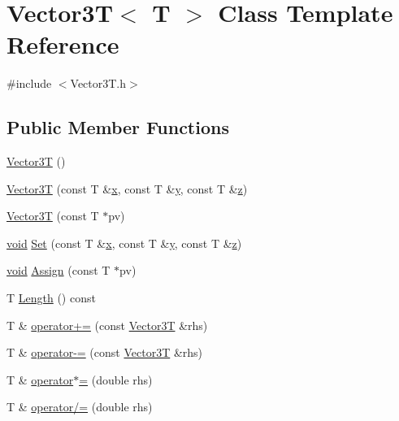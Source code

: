 \hypertarget{class_vector3_t}{\section{Vector3\+T$<$ T $>$ Class Template Reference}
\label{class_vector3_t}
}


{\ttfamily \#include $<$Vector3\+T.\+h$>$}

\subsection*{Public Member Functions}
\begin{DoxyCompactItemize}
\item 
\hyperlink{class_vector3_t_abab8ea3d1ea94c18782f5154469023b0}{Vector3\+T} ()
\item 
\hyperlink{class_vector3_t_a0ab19f96d1244ee04eac4d9e8eea0447}{Vector3\+T} (const T \&\hyperlink{glext_8h_ad77deca22f617d3f0e0eb786445689fc}{x}, const T \&\hyperlink{glext_8h_a9298c7ad619074f5285b32c6b72bfdea}{y}, const T \&\hyperlink{glext_8h_a1483160fae141afea848a5393c286b2b}{z})
\item 
\hyperlink{class_vector3_t_a85ec9693b025744519289511f00aea2e}{Vector3\+T} (const T $\ast$pv)
\item 
\hyperlink{wglext_8h_a9e6b7f1933461ef318bb000d6bd13b83}{void} \hyperlink{class_vector3_t_a4302d8d261afb559e29342f6ade7e2a0}{Set} (const T \&\hyperlink{glext_8h_ad77deca22f617d3f0e0eb786445689fc}{x}, const T \&\hyperlink{glext_8h_a9298c7ad619074f5285b32c6b72bfdea}{y}, const T \&\hyperlink{glext_8h_a1483160fae141afea848a5393c286b2b}{z})
\item 
\hyperlink{wglext_8h_a9e6b7f1933461ef318bb000d6bd13b83}{void} \hyperlink{class_vector3_t_a40ac3fe2e63f553ad7344e9c6ecd3a61}{Assign} (const T $\ast$pv)
\item 
T \hyperlink{class_vector3_t_a732849496977b35c2cca4732ef81b0c3}{Length} () const 
\item 
T \& \hyperlink{class_vector3_t_a48034119665646e58334e4c389a9e71d}{operator+=} (const \hyperlink{class_vector3_t}{Vector3\+T} \&rhs)
\item 
T \& \hyperlink{class_vector3_t_af0109e6ab3cb3aca4aa9ffea9530f374}{operator-\/=} (const \hyperlink{class_vector3_t}{Vector3\+T} \&rhs)
\item 
T \& \hyperlink{class_vector3_t_aee2577a21fb3325937c5ba28cd0bce19}{operator$\ast$=} (double rhs)
\item 
T \& \hyperlink{class_vector3_t_a2d1e777f372212c0a232a226e458233d}{operator/=} (double rhs)
\end{DoxyCompactItemize}

